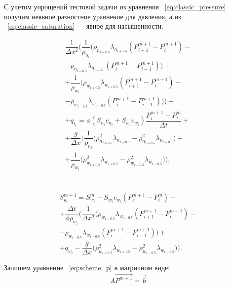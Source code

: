 С учетом упрощений тестовой задачи из уравнения ~\eqref{eq:classic_pressure} получим неявное разностное уравнение для давления,
а из ~\eqref{eq:classic_saturation} --- явное для насыщенности.

\begin{equation} \label{eq:scheme_p}
 \begin{gathered} 
  \dfrac{1}{\Delta x^2} \bigg(\dfrac{1}{\rho_{n_i}} \big( \rho_{n_{i+0.5}} \lambda_{n_{i+0.5}} (P_{i+1}^{m+1} - P_i^{m+1}) -\\
  - \rho_{n_{i-0.5}} \lambda_{n_{i-0.5}} (P_i^{m+1} - P_{i-1}^{m+1})\big) + \\
  + \dfrac{1}{\rho_{w_i}} \big( \rho_{w_{i+0.5}} \lambda_{w_{i+0.5}} (P_{i+1}^{m+1} - P_i^{m+1}) -\\
  - \rho_{w_{i-0.5}} \lambda_{w_{i-0.5}} (P_i^{m+1} - P_{i-1}^{m+1})\big)\bigg) + \\
  + q_{t_i} = \phi(S_{n_i}c_{n_i}+S_{w_i}c_{w_i}) \dfrac{P_i^{m+1} - P_i^m}{\Delta t} +\\
  + \dfrac{g}{\Delta x} \bigg(\dfrac{1}{\rho_{n_i}} \big( \rho_{n_{i+0.5}}^2 \lambda_{n_{i+0.5}} 
  - \rho_{n_{i-0.5}}^2 \lambda_{n_{i-0.5}} \big) + \\
  + \dfrac{1}{\rho_{w_i}} \big( \rho_{w_{i+0.5}}^2 \lambda_{w_{i+0.5}} 
  - \rho_{w_{i-0.5}}^2 \lambda_{w_{i-0.5}} \big)\bigg),
 \end{gathered}
\end{equation}
\\ \\
\begin{equation} \label{eq:scheme_s}
 \begin{gathered} 
  S_{w_i}^{m+1} = S_{w_i}^{m} - S_{w_i}c_{w_i} (P_i^{m+1} - P_i^m) + \\
  + \dfrac{\Delta t}{\phi\rho_{w_i}}\Bigg( \dfrac{1}{\Delta x^2} \bigg(\rho_{w_{i+0.5}} \lambda_{w_{i+0.5}} (P_{i+1}^{m+1} - P_i^{m+1}) -\\
  - \rho_{w_{i-0.5}} \lambda_{w_{i-0.5}} (P_i^{m+1} - P_{i-1}^{m+1}) \bigg) +\\
  + q_{w_i} - \dfrac{g}{\Delta x} \bigg(\rho_{w_{i+0.5}}^2 \lambda_{w_{i+0.5}} - \rho_{w_{i-0.5}}^2 \lambda_{w_{i-0.5}} \bigg) \Bigg).
 \end{gathered}
\end{equation}

Запишем уравнение ~\eqref{eq:scheme_p} в матричном виде:
\begin{equation} \label{eq:scheme_p_matrix}
A\overrightarrow{P^{m+1}} = \vec{b}
\end{equation}

